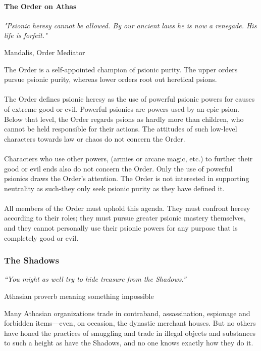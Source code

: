 \begin{multicols}{2}
\paragraph{The Order on Athas}
\epigraph{\textit{
"Psionic heresy cannot be allowed. By our ancient laws he
is now a renegade. His life is forfeit." }}
{ Mandalis, Order Mediator }

The Order is a self‐appointed champion of psionic
purity. The upper orders pursue psionic purity, whereas
lower orders root out heretical psions.\\
\\
The Order defines psionic heresy as the use of
powerful psionic powers for causes of extreme good or
evil. Powerful psionics are powers used by an epic psion.
Below that level, the Order regards psions as hardly more
than children, who cannot be held responsible for their
actions. The attitudes of such low‐level characters
towards law or chaos do not concern the Order.\\
\\
Characters who use other powers, (armies or arcane
magic, etc.) to further their good or evil ends also do not
concern the Order. Only the use of powerful psionics
draws the Order’s attention. The Order is not interested in
supporting neutrality as such‐they only seek psionic
purity as they have defined it.\\
\\
All members of the Order must uphold this agenda.
They must confront heresy according to their roles; they
must pursue greater psionic mastery themselves, and they
cannot personally use their psionic powers for any
purpose that is completely good or evil.

\subsubsection{The Shadows}
\epigraph{\textit{
“You might as well try to hide treasure from the
Shadows.” }}
{ Athasian proverb meaning something impossible }

Many Athasian organizations trade in contraband,
assassination, espionage and forbidden items—even, on
occasion, the dynastic merchant houses. But no others
have honed the practices of smuggling and trade in illegal
objects and substances to such a height as have the
Shadows, and no one knows exactly how they do it.


\end{multicols}
